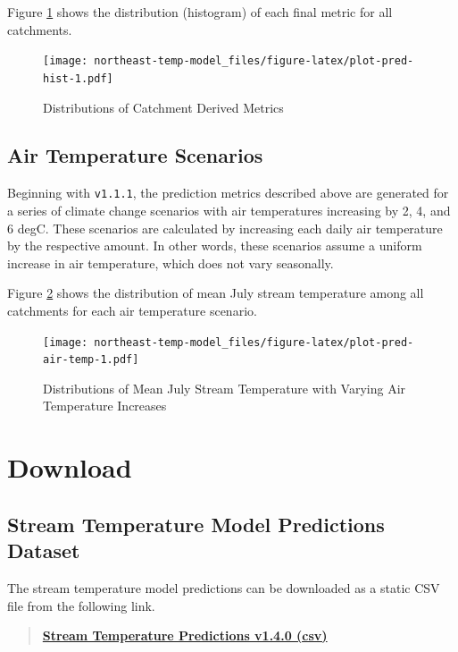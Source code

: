\documentclass[
]{book}
\begin{document}
Figure \ref{fig:plot-pred-hist} shows the distribution (histogram) of each final metric for all catchments.

\begin{figure}
\centering
\texttt{[image: northeast-temp-model\_files/figure-latex/plot-pred-hist-1.pdf]}
\caption{\label{fig:plot-pred-hist}Distributions of Catchment Derived Metrics}
\end{figure}

\section{Air Temperature Scenarios}\label{air-temperature-scenarios}

Beginning with \texttt{v1.1.1}, the prediction metrics described above are generated for a series of climate change scenarios with air temperatures increasing by 2, 4, and 6 degC. These scenarios are calculated by increasing each daily air temperature by the respective amount. In other words, these scenarios assume a uniform increase in air temperature, which does not vary seasonally.

Figure \ref{fig:plot-pred-air-temp} shows the distribution of mean July stream temperature among all catchments for each air temperature scenario.

\begin{figure}
\centering
\texttt{[image: northeast-temp-model\_files/figure-latex/plot-pred-air-temp-1.pdf]}
\caption{\label{fig:plot-pred-air-temp}Distributions of Mean July Stream Temperature with Varying Air Temperature Increases}
\end{figure}

\chapter{Download}\label{download}

\section{Stream Temperature Model Predictions Dataset}\label{stream-temperature-model-predictions-dataset}

The stream temperature model predictions can be downloaded as a static CSV file from the following link.

\begin{quote}
\textbf{\href{https://ecosheds.s3.amazonaws.com/northeast-temp-model/output/sheds-temp-model-v1.4.0.csv}{Stream Temperature Predictions v1.4.0 (csv)}}
\end{quote}
\end{document}
